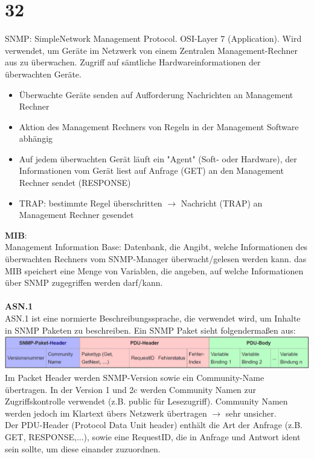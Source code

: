 \documentclass[12pt, a4paper]{article}
\begin{document}
\section*{32}
	SNMP: SimpleNetwork Management Protocol. OSI-Layer 7 (Application).
	Wird verwendet, um Geräte im Netzwerk von einem Zentralen Management-Rechner aus zu überwachen.
	Zugriff auf sämtliche Hardwareinformationen der überwachten Geräte.
	\begin{itemize}
		\item Überwachte Geräte senden auf Aufforderung Nachrichten an Management Rechner
		\item Aktion des Management Rechners von Regeln in der Management Software abhängig
		\item Auf jedem überwachten Gerät läuft ein "Agent" (Soft- oder Hardware), der Informationen vom Gerät liest auf Anfrage (GET) an den Management Rechner sendet (RESPONSE)
		\item TRAP: bestimmte Regel überschritten $\rightarrow$ Nachricht (TRAP) an Management Rechner gesendet
	\end{itemize}
	\textbf{MIB}:\\
	Management Information Base: Datenbank, die Angibt, welche Informationen des überwachten Rechners vom SNMP-Manager überwacht/gelesen werden kann. das MIB speichert eine Menge von Variablen, die angeben, auf welche Informationen über SNMP zugegriffen werden darf/kann.
	\\
	\\
	\textbf{ASN.1}\\
	ASN.1 ist eine normierte Beschreibungssprache, die verwendet wird, um Inhalte in SNMP Paketen zu beschreiben. Ein SNMP Paket sieht folgendermaßen aus:\\
	\includegraphics[width = \textwidth]{snmp_header.png}
	\\
	Im Packet Header werden SNMP-Version sowie ein Community-Name übertragen. In der Version 1 und 2c werden Community Namen zur Zugriffskontrolle verwendet (z.B. public für Lesezugriff). Community Namen werden jedoch im Klartext übers Netzwerk übertragen $\rightarrow$ sehr unsicher.\\
	Der PDU-Header (Protocol Data Unit header) enthält die Art der Anfrage (z.B. GET, RESPONSE,...), sowie eine RequestID, die in Anfrage und Antwort ident sein sollte, um diese einander zuzuordnen.
\end{document}
